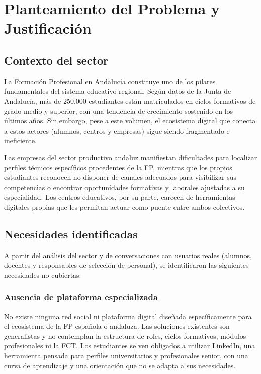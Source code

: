 \documentclass[a4paper]{report}
\begin{document}
\chapter{Planteamiento del Problema y Justificación}

\section{Contexto del sector}

La Formación Profesional en Andalucía constituye uno de los pilares fundamentales del sistema educativo regional. Según datos de la Junta de Andalucía, más de 250.000 estudiantes están matriculados en ciclos formativos de grado medio y superior, con una tendencia de crecimiento sostenido en los últimos años. Sin embargo, pese a este volumen, el ecosistema digital que conecta a estos actores (alumnos, centros y empresas) sigue siendo fragmentado e ineficiente.

Las empresas del sector productivo andaluz manifiestan dificultades para localizar perfiles técnicos específicos procedentes de la FP, mientras que los propios estudiantes reconocen no disponer de canales adecuados para visibilizar sus competencias o encontrar oportunidades formativas y laborales ajustadas a su especialidad. Los centros educativos, por su parte, carecen de herramientas digitales propias que les permitan actuar como puente entre ambos colectivos.

\section{Necesidades identificadas}

A partir del análisis del sector y de conversaciones con usuarios reales (alumnos, docentes y responsables de selección de personal), se identificaron las siguientes necesidades no cubiertas:

\subsection{Ausencia de plataforma especializada}

No existe ninguna red social ni plataforma digital diseñada específicamente para el ecosistema de la FP española o andaluza. Las soluciones existentes son generalistas y no contemplan la estructura de roles, ciclos formativos, módulos profesionales ni la FCT. Los estudiantes se ven obligados a utilizar LinkedIn, una herramienta pensada para perfiles universitarios y profesionales senior, con una curva de aprendizaje y una orientación que no se adapta a sus necesidades.
\end{document}
